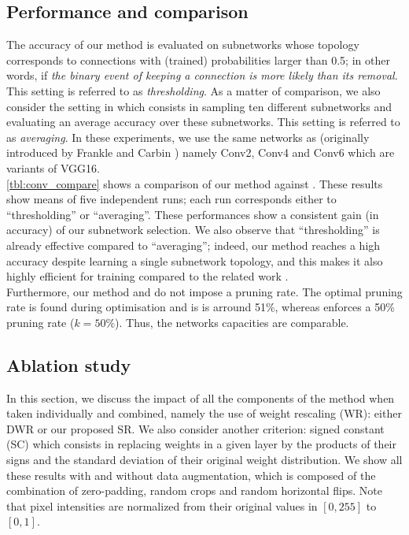     

\subsection{Performance and comparison}
The accuracy of our method is evaluated on subnetworks whose topology
corresponds to connections with  (trained) probabilities larger than 0.5;  in
other words,  if {\it the binary event of keeping a connection is more likely
than its removal}.  This setting is referred to as  {\it thresholding}.  As a
matter of comparison,  we also consider the setting in
\cite{DBLP:conf/nips/ZhouLLY19} which consists in sampling ten different
subnetworks and evaluating an average accuracy over  these subnetworks.  This
setting  is referred to as {\it averaging}.  In these experiments,  we use the
same networks as
\cite{DBLP:conf/nips/ZhouLLY19,DBLP:conf/cvpr/RamanujanWKFR20} (originally
introduced by  Frankle and Carbin \cite{DBLP:conf/iclr/FrankleC19}) namely
Conv2,  Conv4 and Conv6 which are  variants of  VGG16. \\
\indent   \cref{tbl:conv_compare}  shows a comparison of our method against
\cite{DBLP:conf/nips/ZhouLLY19,DBLP:conf/cvpr/RamanujanWKFR20}.    These
results show means of five independent runs; each run corresponds either to
``thresholding'' or ``averaging''.  These performances show a consistent gain
(in accuracy) of our subnetwork selection.   We also observe that
``thresholding'' is already effective compared to ``averaging''; indeed, our
method reaches a  high accuracy despite learning a single subnetwork topology,
and this makes it also highly efficient for training compared to  the related
work \cite{DBLP:conf/nips/ZhouLLY19,DBLP:conf/cvpr/RamanujanWKFR20}.\\ 
\indent Furthermore, our method and \cite{DBLP:conf/nips/ZhouLLY19} do not
impose a pruning rate. The optimal pruning rate is found during optimisation and
is is arround 51\%, whereas \cite{DBLP:conf/cvpr/RamanujanWKFR20} enforces a 50\%
pruning rate ($k=50\%$). Thus, the networks capacities
are comparable. \\


  \subsection{Ablation study}
  In this section, we discuss the impact of all the components of the method
  when taken individually and combined,  namely the use of weight rescaling
  (WR): either DWR or our proposed SR.   We also consider another criterion:
  signed constant  (SC) which consists in replacing weights in a given layer by
  the products of their signs and the standard deviation of their original
  weight distribution.  We show  all these results with and without data
  augmentation, which is composed of the combination of zero-padding,  random crops and
  random  horizontal flips.   Note that  pixel intensities are normalized  from
  their original values in $[0,255]$ to $[0,1]$.
    
